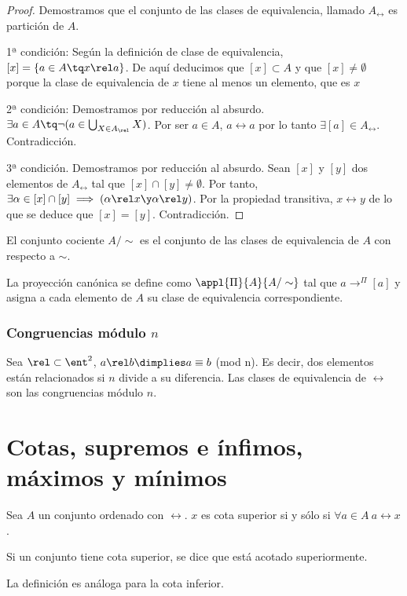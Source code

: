 \documentclass[nochap]{apuntes}
\begin{document}
\begin{proof}
Demostramos que el conjunto de las clases de equivalencia, llamado $A_\rel$ es partición de $A$.

1ª condición: Según la definición de clase de equivalencia, $[x] =\{ a \in A \tq x\rel a\}$. De aquí deducimos que $[x] \subset A$ y que $[x]\neq \emptyset$ porque la clase de equivalencia de $x$ tiene al menos un elemento, que es $x$

2ª condición: Demostramos por reducción al absurdo. $\exists a \in A \tq \neg(a \in \bigcup_{X\in A_\rel} X)$. Por ser $a\in A$, $a\rel a$ por lo tanto $\exists [a] \in A_\rel$. Contradicción.

3ª condición. Demostramos por reducción al absurdo. Sean $[x]$ y $[y]$ dos elementos de $A_\rel$ tal que $[x] \cap [y] \neq \emptyset$. Por tanto, $\exists \alpha \in [x] \cap [y] \implies (\alpha \rel x \y \alpha \rel y)$. Por la propiedad transitiva, $x\rel y$ de lo que se deduce que $[x]=[y]$. Contradicción.
\end{proof}

\begin{defn} El conjunto cociente $A/\sim$ es el conjunto de las clases de equivalencia de $A$ con respecto a $\sim$.\end{defn}

\begin{defn} La proyección canónica se define como $\appl{\Pi}{A}{A/\sim}$ tal que $a\longrightarrow^{\Pi}[a]$ y asigna a cada elemento de $A$ su clase de equivalencia correspondiente.\end{defn}

\subsubsection{Congruencias módulo $n$}
 Sea $\rel\subset \ent^2$, $a\rel b\dimplies a\equiv b$ (mod n). Es decir, dos elementos están relacionados si $n$ divide a su diferencia. Las clases de equivalencia de $\rel$ son las congruencias módulo $n$.

\section{Cotas, supremos e ínfimos, máximos y mínimos}

\begin{defn} Sea $A$ un conjunto ordenado con $\rel$. $x$ es cota superior si y sólo si $\forall a\in A \: a\rel x$.

Si un conjunto tiene cota superior, se dice que está acotado superiormente.

La definición es análoga para la cota inferior.
\end{defn}
\end{document}
